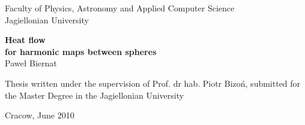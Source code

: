 \thispagestyle{empty}

\begin{center}
\large\sffamily Faculty of Physics, Astronomy and Applied Computer Science\\
Jagiellonian University

\vspace*{1cm} {\Huge\sffamily\bfseries Heat flow\\
for harmonic maps between spheres
\\}
\vspace{2cm}
{\LARGE\sffamily
Paweł Biernat\\
\vspace{3.cm} }

\begin{minipage}{.15\linewidth}
  
\end{minipage}
\vspace{3.cm}

\begin{minipage}{0.9\textwidth} {\centering\large\sffamily Thesis written under the
    supervision of Prof. dr hab.  Piotr Bizoń, submitted for the
    Master Degree in the Jagiellonian University\\}
\end{minipage}
\end{center}

\begin{center}
\vspace{1.5cm}
{\large\sffamily Cracow, June 2010}
\end{center}

